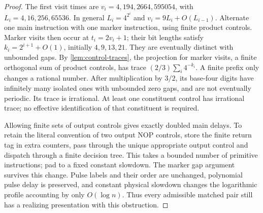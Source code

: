 \begin{proof}
The first visit times are $v_i=4,194,2664,595054$, with $L_i=4,16,256,65536$. In general $L_i=4^{2^i}$ and $v_i=9L_i+O(L_{i-1})$. Alternate one main instruction with one marker instruction, using finite product controls. Marker visits then occur at $t_i=2v_i+1$; their bit lengths satisfy $k_i=2^{i+1}+O(1)$, initially $4,9,13,21$. They are eventually distinct with unbounded gaps. By \cref{lem:control-traces}, the projection for marker visits, a finite orthogonal sum of product controls, has trace $(2/3)\sum_i4^{-k_i}$. A finite prefix only changes a rational number. After multiplication by $3/2$, its base-four digits have infinitely many isolated ones with unbounded zero gaps, and are not eventually periodic. Its trace is irrational. At least one constituent control has irrational trace; no effective identification of that constituent is required.

Allowing finite sets of output controls gives exactly doubled main delays. To retain the literal convention of two output NOP controls, store the finite return tag in extra counters, pass through the unique appropriate output control and dispatch through a finite decision tree. This takes a bounded number of primitive instructions; pad to a fixed constant slowdown. The marker gap argument survives this change. Pulse labels and their order are unchanged, polynomial pulse delay is preserved, and constant physical slowdown changes the logarithmic profile accounting by only $O(\log n)$. Thus every admissible matched pair still has a realizing presentation with this obstruction.
\end{proof}

